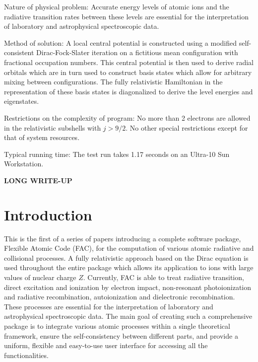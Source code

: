 \documentclass{elsart}
\begin{document}
Nature of physical problem: Accurate energy levels of atomic ions and the
radiative transition rates between these levels are essential for the
interpretation of laboratory and astrophysical spectroscopic data.

Method of solution: A local central potential is constructed using a modified
self-consistent Dirac-Fock-Slater iteration on a fictitious mean configuration
with fractional occupation numbers. This central potential is then used to
derive radial orbitals which are in turn used to construct basis states which
allow for arbitrary mixing between configurations. The fully
relativistic Hamiltonian in the representation of these basis states is
diagonalized to derive the level energies and eigenstates. 

Restrictions on the complexity of program: No more than 2 electrons are
allowed in the relativistic subshells with $j > 9/2$. No other special
restrictions except for that of system resources.

Typical running time: The test run takes 1.17 seconds on an Ultra-10 Sun
Workstation. 

\textbf{\large LONG WRITE-UP}

\section{Introduction}
This is the first of a series of papers introducing a complete software
package, Flexible Atomic Code (FAC), for the computation of various atomic
radiative and collisional processes. A fully relativistic approach based on
the Dirac equation is used throughout the entire package which allows its
application to ions with large values of nuclear charge $Z$. Currently, FAC
is able to treat radiative transition, direct excitation and
ionization by electron impact, non-resonant photoionization and radiative
recombination, autoionization and dielectronic recombination. These processes
are essential for the interpretation of laboratory and astrophysical 
spectroscopic data. The main goal of creating such a comprehensive package is
to integrate various atomic processes within a single theoretical framework,
ensure the self-consistency between different parts, and provide a uniform,
flexible and easy-to-use user interface for accessing all the
functionalities. 
\end{document}
